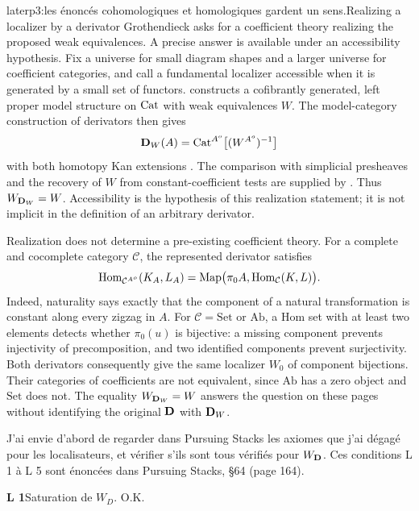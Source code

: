 \begin{dcomment}{later}{p3:les énoncés cohomologiques et homologiques gardent un sens.}{Realizing a localizer by a derivator}
Grothendieck asks for a coefficient theory realizing the proposed weak equivalences. A precise answer is available under an accessibility hypothesis. Fix a universe for small diagram shapes and a larger universe for coefficient categories, and call a fundamental localizer accessible when it is generated by a small set of functors. \citet[Theorem~5.2.15]{Cisinski2006} constructs a cofibrantly generated, left proper model structure on $\mathrm{Cat}$ with weak equivalences $W$. The model-category construction of derivators then gives
\[
 \mathbf{D}_W(A)=\mathrm{Cat}^{A^o}\bigl[(W^{A^o})^{-1}\bigr]
\]
with both homotopy Kan extensions \citep[Theorem~6.11 and its dual]{Cisinski2003}. The comparison with simplicial presheaves and the recovery of $W$ from constant-coefficient tests are supplied by \citet[Lemma~4.2.13, Theorem~4.2.15, and Corollary~4.2.18]{Cisinski2006}. Thus $W_{\mathbf{D}_W}=W$. Accessibility is the hypothesis of this realization statement; it is not implicit in the definition of an arbitrary derivator.

Realization does not determine a pre-existing coefficient theory. For a complete and cocomplete category $\mathcal C$, the represented derivator satisfies
\[
 \mathrm{Hom}_{\mathcal C^{A^o}}(K_A,L_A)
   =\operatorname{Map}\bigl(\pi_0 A,\mathrm{Hom}_{\mathcal C}(K,L)\bigr).
\]
Indeed, naturality says exactly that the component of a natural transformation is constant along every zigzag in $A$. For $\mathcal C=\mathrm{Set}$ or $\mathrm{Ab}$, a Hom set with at least two elements detects whether $\pi_0(u)$ is bijective: a missing component prevents injectivity of precomposition, and two identified components prevent surjectivity. Both derivators consequently give the same localizer $W_0$ of component bijections. Their categories of coefficients are not equivalent, since $\mathrm{Ab}$ has a zero object and $\mathrm{Set}$ does not. The equality $W_{\mathbf{D}_W}=W$ answers the question on these pages without identifying the original $\mathbf{D}$ with $\mathbf{D}_W$.
\end{dcomment}


J’ai envie d’abord de regarder dans Pursuing Stacks les axiomes que j’ai dégagé pour les localisateurs, et vérifier s’ils sont tous vérifiés pour
$W_{\mathbf{D}}$. Ces conditions L 1 à L 5 sont énoncées dans Pursuing Stacks, §64 (page 164).

\textbf{L 1}\enspace Saturation de $W_D$. O.K.

